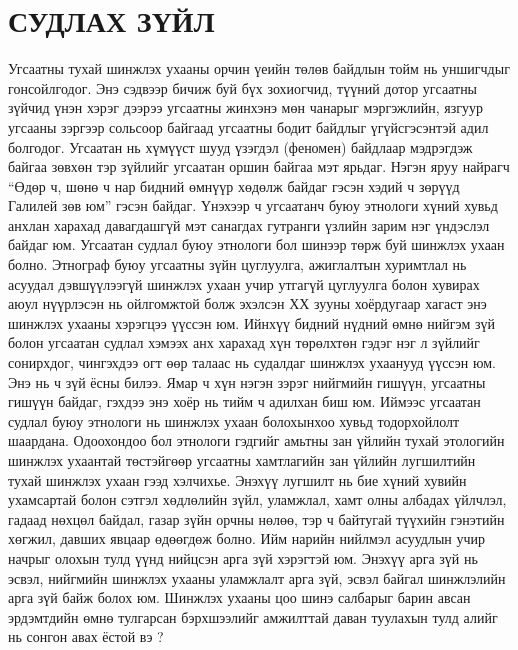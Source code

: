 \section*{СУДЛАХ ЗҮЙЛ}

Угсаатны тухай шинжлэх ухааны орчин үеийн төлөв байдлын тойм нь уншигчдыг гонсойлгодог. Энэ сэдвээр бичиж буй бүх зохиогчид, түүний дотор угсаатны зүйчид үнэн хэрэг дээрээ угсаатны жинхэнэ мөн чанарыг мэргэжлийн, язгуур угсааны зэргээр сольсоор байгаад угсаатны бодит байдлыг үгүйсгэсэнтэй адил болгодог. Угсаатан нь хүмүүст шууд үзэгдэл (феномен) байдлаар мэдрэгдэж байгаа зөвхөн тэр зүйлийг угсаатан оршин байгаа мэт ярьдаг. Нэгэн яруу найрагч “Өдөр ч, шөнө ч нар бидний өмнүүр хөдөлж байдаг гэсэн хэдий ч зөрүүд Галилей зөв юм” гэсэн байдаг. Үнэхээр ч угсаатанч буюу этнологи хүний хувьд анхлан харахад давагдашгүй мэт санагдах гутранги үзлийн зарим нэг үндэслэл байдаг юм.
Угсаатан судлал буюу этнологи бол шинээр төрж буй шинжлэх ухаан болно. Этнограф буюу угсаатны зүйн цуглуулга, ажиглалтын хуримтлал нь асуудал дэвшүүлээгүй шинжлэх ухаан учир утгагүй цуглуулга болон хувирах аюул нүүрлэсэн нь ойлгомжтой болж эхэлсэн ХХ зууны хоёрдугаар хагаст энэ шинжлэх ухааны хэрэгцээ үүссэн юм. Ийнхүү бидний нүдний өмнө нийгэм зүй болон угсаатан судлал хэмээх анх харахад хүн төрөлхтөн гэдэг нэг л зүйлийг сонирхдог, чингэхдээ огт өөр талаас нь судалдаг шинжлэх ухаанууд үүссэн юм. Энэ нь ч зүй ёсны билээ. Ямар ч хүн нэгэн зэрэг нийгмийн гишүүн, угсаатны гишүүн байдаг, гэхдээ энэ хоёр нь тийм ч адилхан биш юм. Иймээс угсаатан судлал буюу этнологи нь шинжлэх ухаан болохынхоо хувьд тодорхойлолт шаардана. Одоохондоо бол этнологи гэдгийг амьтны зан үйлийн тухай этологийн шинжлэх ухаантай төстэйгөөр угсаатны хамтлагийн зан үйлийн лугшилтийн тухай шинжлэх ухаан гээд хэлчихье. Энэхүү лугшилт нь бие хүний хувийн ухамсартай болон сэтгэл хөдлөлийн зүйл, уламжлал, хамт олны албадах үйлчлэл, гадаад нөхцөл байдал, газар зүйн орчны нөлөө, тэр ч байтугай түүхийн гэнэтийн хөгжил, давших явцаар өдөөгдөж болно. Ийм нарийн нийлмэл асуудлын учир начрыг олохын тулд үүнд нийцсэн арга зүй хэрэгтэй юм. Энэхүү арга зүй нь эсвэл, нийгмийн шинжлэх ухааны уламжлалт арга зүй, эсвэл байгал шинжлэлийн арга зүй байж болох юм. Шинжлэх ухааны цоо шинэ салбарыг барин авсан эрдэмтдийн өмнө тулгарсан бэрхшээлийг амжилттай даван туулахын тулд алийг нь сонгон авах ёстой вэ ?

